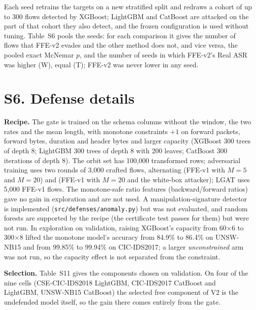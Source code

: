 Each seed retrains the targets on a new stratified split and redraws a cohort of up to 300 flows detected by XGBoost; LightGBM and CatBoost are attacked on the part of that cohort they also detect, and the frozen configuration is used without tuning. Table~S6 pools the seeds: for each comparison it gives the number of flows that FFE-v2 evades and the other method does not, and vice versa, the pooled exact McNemar $p$, and the number of seeds in which FFE-v2's Real ASR was higher (W), equal (T); FFE-v2 was never lower in any seed.

\begin{table}[!htbp]
\centering
\caption*{Table S6. Pooled paired comparison of FFE-v2 with FFE-v1, the control and CAPGD over seeds.}
\scriptsize
\resizebox{\textwidth}{!}{%
%
}
\end{table}

\section*{S6. Defense details}

\textbf{Recipe.} The gate is trained on the schema columns without the window, the two rates and the mean length, with monotone constraints $+1$ on forward packets, forward bytes, duration and header bytes and larger capacity (XGBoost 300 trees of depth 8; LightGBM 300 trees of depth 8 with 200 leaves; CatBoost 300 iterations of depth 8). The orbit set has 100,000 transformed rows; adversarial training uses two rounds of 3,000 crafted flows, alternating (FFE-v1 with $M=5$ and $M=20$) and (FFE-v1 with $M=20$ and the white-box attacker); LGAT uses 5,000 FFE-v1 flows. The monotone-safe ratio features (backward/forward ratios) gave no gain in exploration and are not used. A manipulation-signature detector is implemented (\texttt{src/defenses/anomaly.py}) but was not evaluated, and random forests are supported by the recipe (the certificate test passes for them) but were not run. In exploration on validation, raising XGBoost's capacity from 60$\times$6 to 300$\times$8 lifted the monotone model's accuracy from 84.9\% to 86.4\% on UNSW-NB15 and from 99.85\% to 99.94\% on CIC-IDS2017; a larger \emph{unconstrained} arm was not run, so the capacity effect is not separated from the constraint.

\textbf{Selection.} Table~S11 gives the components chosen on validation. On four of the nine cells (CSE-CIC-IDS2018 LightGBM, CIC-IDS2017 CatBoost and LightGBM, UNSW-NB15 CatBoost) the selected free component of V2 is the undefended model itself, so the gain there comes entirely from the gate.

